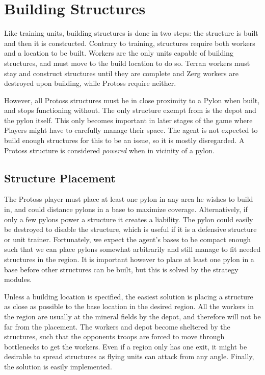 \section{Building Structures}
Like training units, building structures is done in two steps: the structure is built and then it is constructed. Contrary to training, structures require both workers and a location to be built. Workers are the only units capable of building structures, and must move to the build location to do so. Terran workers must stay and construct structures until they are complete and Zerg workers are destroyed upon building, while Protoss require neither.

However, all Protoss structures must be in close proximity to a Pylon when built, and stops functioning without. The only structure exempt from is the depot and the pylon itself. This only becomes important in later stages of the game where Players might have to carefully manage their space. The agent is not expected to build enough structures for this to be an issue, so it is mostly disregarded. A Protoss structure is considered \emph{powered} when in vicinity of a pylon.

	\subsection*{Structure Placement}
	The Protoss player must place at least one pylon in any area he wishes to build in, and could distance pylons in a base to maximize coverage. Alternatively, if only a few pylons power a structure it creates a liability. The pylon could easily be destroyed to disable the structure, which is useful if it is a defensive structure or unit trainer. Fortunately, we expect the agent's bases to be compact enough such that we can place pylons somewhat arbitrarily and still manage to fit needed structures in the region. It is important however to place at least one pylon in a base before other structures can be built, but this is solved by the strategy modules.
	
	Unless a building location is specified, the easiest solution is placing a structure as close as possible to the base location in the desired region. All the workers in the region are usually at the mineral fields by the depot, and therefore will not be far from the placement. The workers and depot become sheltered by the structures, such that the opponents troops are forced to move through bottlenecks to get the workers. Even if a region only has one exit, it might be desirable to spread structures as flying units can attack from any angle. Finally, the solution is easily implemented.
	
